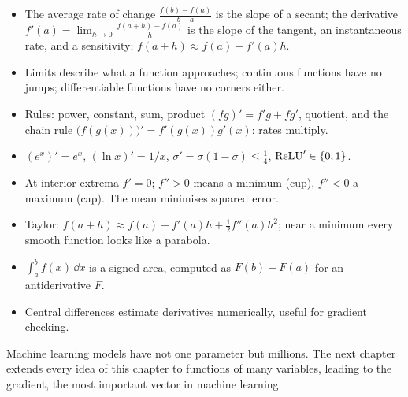 \begin{keytakeaways}
\begin{itemize}
  \item The average rate of change $\frac{f(b) - f(a)}{b - a}$ is the slope of
    a secant; the derivative $f'(a) = \lim_{h\to0}\frac{f(a+h) - f(a)}{h}$ is the
    slope of the tangent, an instantaneous rate, and a sensitivity:
    $f(a + h) \approx f(a) + f'(a)h$.
  \item Limits describe what a function approaches; continuous functions have
    no jumps; differentiable functions have no corners either.
  \item Rules: power, constant, sum, product $(fg)' = f'g + fg'$, quotient, and
    the chain rule $\bigl(f(g(x))\bigr)' = f'(g(x))g'(x)$: rates multiply.
  \item $(e^x)' = e^x$, $(\ln x)' = 1/x$, $\sigma' = \sigma(1 - \sigma) \le
    \frac14$, $\operatorname{ReLU}' \in \{0, 1\}$.
  \item At interior extrema $f' = 0$; $f'' > 0$ means a minimum (cup), $f'' < 0$
    a maximum (cap). The mean minimises squared error.
  \item Taylor: $f(a + h) \approx f(a) + f'(a)h + \frac12f''(a)h^2$; near a
    minimum every smooth function looks like a parabola.
  \item $\int_a^b f(x)\,\dd x$ is a signed area, computed as $F(b) - F(a)$ for
    an antiderivative $F$.
  \item Central differences estimate derivatives numerically, useful for
    gradient checking.
\end{itemize}
\end{keytakeaways}

Machine learning models have not one parameter but millions. The next chapter
extends every idea of this chapter to functions of many variables, leading to
the gradient, the most important vector in machine learning.
